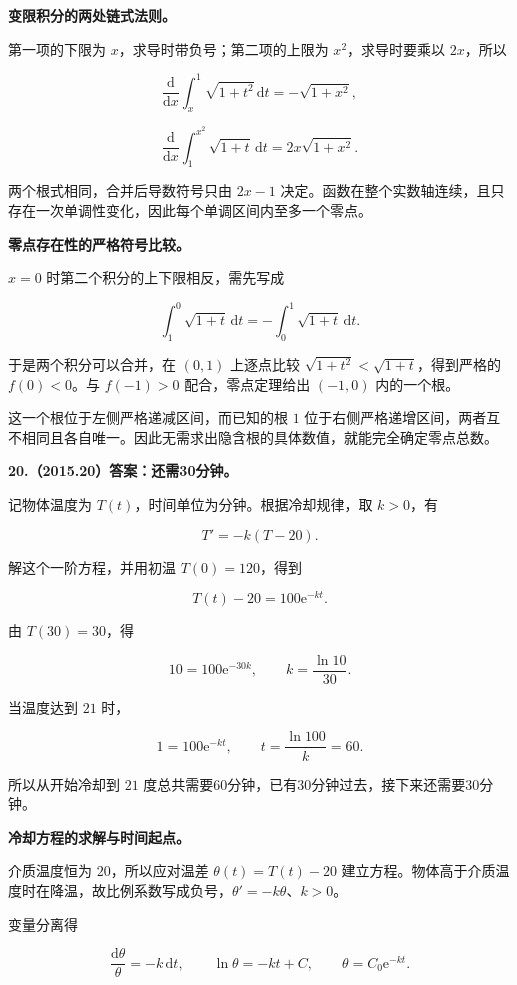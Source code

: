 \documentclass[UTF8,11pt,fontset=windows]{ctexart}
\begin{document}
\textbf{变限积分的两处链式法则。}

第一项的下限为 $x$，求导时带负号；第二项的上限为 $x^2$，求导时要乘以 $2x$，所以

$$
\frac{\mathrm d}{\mathrm dx}\int_x^1\sqrt{1+t^2}\,\mathrm dt
=-\sqrt{1+x^2},
$$

$$
\frac{\mathrm d}{\mathrm dx}\int_1^{x^2}\sqrt{1+t}\,\mathrm dt
=2x\sqrt{1+x^2}.
$$

两个根式相同，合并后导数符号只由 $2x-1$ 决定。函数在整个实数轴连续，且只存在一次单调性变化，因此每个单调区间内至多一个零点。

\textbf{零点存在性的严格符号比较。}

$x=0$ 时第二个积分的上下限相反，需先写成

$$
\int_1^0\sqrt{1+t}\,\mathrm dt
=-\int_0^1\sqrt{1+t}\,\mathrm dt.
$$

于是两个积分可以合并，在 $(0,1)$ 上逐点比较 $\sqrt{1+t^2}<\sqrt{1+t}$，得到严格的 $f(0)<0$。与 $f(-1)>0$ 配合，零点定理给出 $(-1,0)$ 内的一个根。

这一个根位于左侧严格递减区间，而已知的根 $1$ 位于右侧严格递增区间，两者互不相同且各自唯一。因此无需求出隐含根的具体数值，就能完全确定零点总数。

\clearpage

\textbf{20.（2015.20）答案：还需30分钟。}

记物体温度为 $T(t)$，时间单位为分钟。根据冷却规律，取 $k>0$，有

$$
T'=-k(T-20).
$$

解这个一阶方程，并用初温 $T(0)=120$，得到

$$
T(t)-20=100\mathrm e^{-kt}.
$$

由 $T(30)=30$，得

$$
10=100\mathrm e^{-30k},
\qquad k=\frac{\ln10}{30}.
$$

当温度达到 $21$ 时，

$$
1=100\mathrm e^{-kt},
\qquad t=\frac{\ln100}{k}=60.
$$

所以从开始冷却到 $21$ 度总共需要60分钟，已有30分钟过去，接下来还需要30分钟。

\textbf{冷却方程的求解与时间起点。}

介质温度恒为 $20$，所以应对温差 $\theta(t)=T(t)-20$ 建立方程。物体高于介质温度时在降温，故比例系数写成负号，$\theta'=-k\theta$、$k>0$。

变量分离得

$$
\frac{\mathrm d\theta}{\theta}=-k\,\mathrm dt,
\qquad
\ln\theta=-kt+C,
\qquad
\theta=C_0\mathrm e^{-kt}.
$$
\end{document}
